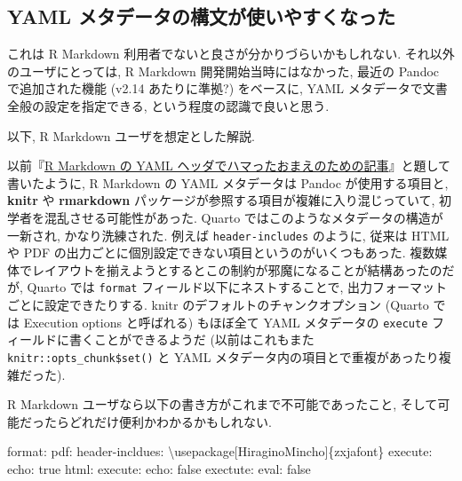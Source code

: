 \documentclass[
  letterpaper,
  DIV=11,
  pandoc,
  ja=standard,
  jafont=noto-otf]{bxjsarticle}
\newenvironment{Shaded}{\begin{snugshade}}{\end{snugshade}}
\newcommand{\AttributeTok}[1]{\textcolor[rgb]{0.00,0.48,0.65}{#1}}
\newcommand{\CharTok}[1]{\textcolor[rgb]{0.13,0.47,0.30}{#1}}
\newcommand{\FunctionTok}[1]{\textcolor[rgb]{0.28,0.35,0.67}{#1}}
\newcommand{\KeywordTok}[1]{\textcolor[rgb]{0.00,0.48,0.65}{#1}}
\begin{document}
\hypertarget{yaml-ux30e1ux30bfux30c7ux30fcux30bfux306eux69cbux6587ux304cux4f7fux3044ux3084ux3059ux304fux306aux3063ux305f}{%
\subsection{YAML
メタデータの構文が使いやすくなった}\label{yaml-ux30e1ux30bfux30c7ux30fcux30bfux306eux69cbux6587ux304cux4f7fux3044ux3084ux3059ux304fux306aux3063ux305f}}

これは R Markdown 利用者でないと良さが分かりづらいかもしれない.
それ以外のユーザにとっては, R Markdown 開発開始当時にはなかった, 最近の
Pandoc で追加された機能 (v2.14 あたりに準拠?) をベースに, YAML
メタデータで文書全般の設定を指定できる, という程度の認識で良いと思う.

以下, R Markdown ユーザを想定とした解説.

以前『\href{https://ill-identified.hatenablog.com/entry/2020/09/05/202403}{R
Markdown の YAML
ヘッダでハマったおまえのための記事}』と題して書いたように, R Markdown の
YAML メタデータは Pandoc が使用する項目と, \textbf{knitr} や
\textbf{rmarkdown} パッケージが参照する項目が複雑に入り混じっていて,
初学者を混乱させる可能性があった. Quarto
ではこのようなメタデータの構造が一新され, かなり洗練された. 例えば
\texttt{header-includes} のように, 従来は HTML や PDF
の出力ごとに個別設定できない項目というのがいくつもあった.
複数媒体でレイアウトを揃えようとするとこの制約が邪魔になることが結構あったのだが,
Quarto では \texttt{format} フィールド以下にネストすることで,
出力フォーマットごとに設定できたりする. knitr
のデフォルトのチャンクオプション (Quarto では Execution options
と呼ばれる) もほぼ全て YAML メタデータの \texttt{execute}
フィールドに書くことができるようだ (以前はこれもまた
\texttt{knitr::opts\_chunk\$set()} と YAML
メタデータ内の項目とで重複があったり複雑だった).

R Markdown ユーザなら以下の書き方がこれまで不可能であったこと,
そして可能だったらどれだけ便利かわかるかもしれない.

\begin{Shaded}
\begin{Highlighting}[]
\FunctionTok{format}\KeywordTok{:}
\AttributeTok{  }\FunctionTok{pdf}\KeywordTok{:}
\AttributeTok{    }\FunctionTok{header{-}incldues}\KeywordTok{:}
\AttributeTok{      \textbackslash{}usepackage[HiraginoMincho]\{zxjafont\}}
\AttributeTok{    }\FunctionTok{execute}\KeywordTok{:}
\AttributeTok{      }\FunctionTok{echo}\KeywordTok{:}\AttributeTok{ }\CharTok{true}
\AttributeTok{  }\FunctionTok{html}\KeywordTok{:}
\AttributeTok{    }\FunctionTok{execute}\KeywordTok{:}
\AttributeTok{      }\FunctionTok{echo}\KeywordTok{:}\AttributeTok{ }\CharTok{false}
\FunctionTok{exectute}\KeywordTok{:}
\AttributeTok{  }\FunctionTok{eval}\KeywordTok{:}\AttributeTok{ }\CharTok{false}
\end{Highlighting}
\end{Shaded}
\end{document}
